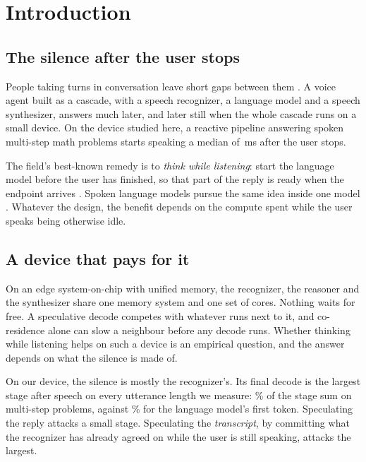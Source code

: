 \chapter{Introduction}
\label{ch:intro}

\section{The silence after the user stops}

People taking turns in conversation leave short gaps between them
\cite{stivers2009universals}. A voice agent built as a cascade, with a speech
recognizer, a language model and a speech synthesizer, answers much later,
and later still when the whole cascade runs on a small device. On the device
studied here, a reactive pipeline answering spoken multi-step math problems
starts speaking a median of \TTFAMulti\,ms after the user stops.

The field's best-known remedy is to \emph{think while listening}: start the
language model before the user has finished, so that part of the reply is
ready when the endpoint arrives
\cite{predgen2025,ltsvoiceagent2026,epa2026,livemind2024}. Spoken language
models pursue the same idea inside one model
\cite{shanks2025,stitch2026,shih2025thinklisten}. Whatever the design, the
benefit depends on the compute spent while the user speaks being otherwise
idle.

\section{A device that pays for it}

On an edge system-on-chip with unified memory, the recognizer, the reasoner
and the synthesizer share one memory system and one set of cores. Nothing
waits for free. A speculative decode competes with whatever runs next to it,
and co-residence alone can slow a neighbour before any decode runs. Whether
thinking while listening helps on such a device is an empirical question, and
the answer depends on what the silence is made of.

On our device, the silence is mostly the recognizer's. Its final decode is the
largest stage after speech on every utterance length we measure:
\SttShareMulti\% of the stage sum on multi-step problems, against
\LlmShareMulti\% for the language model's first token. Speculating the reply
attacks a small stage. Speculating the \emph{transcript}, by committing what
the recognizer has already agreed on while the user is still speaking, attacks
the largest.


